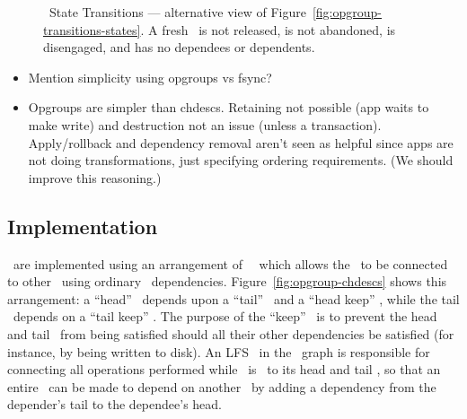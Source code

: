 \begin{figure}[htb]
\caption{\label{fig:opgroup-transitions-intuition} \Opgroup\ State
  Transitions --- alternative view of
  Figure~\ref{fig:opgroup-transitions-states}. A fresh \opgroup\ is
  not released, is not abandoned, is disengaged, and has no dependees
  or dependents.}
\end{figure}


\begin{itemize}
\item Mention simplicity using opgroups vs fsync?
\item Opgroups are simpler than chdescs. Retaining not possible (app
  waits to make write) and destruction not an issue (unless a
  transaction). Apply/rollback and dependency removal aren't seen as
  helpful since apps are not doing transformations, just specifying
  ordering requirements. (We should improve this reasoning.)
\end{itemize}


\subsection{Implementation}
\label{sec:opgroup:implementation}


\Opgroups\ are implemented using an arrangement of \noop\ \chdescs\ which allows
the \opgroup\ to be connected to other \opgroups\ using ordinary \chdesc\
dependencies.  Figure~\ref{fig:opgroup-chdescs} shows this arrangement: a
``head'' \chdesc\ depends upon a ``tail'' \chdesc\ and a ``head keep'' \chdesc,
while the tail \chdesc\ depends on a ``tail keep'' \chdesc. The purpose of the
``keep'' \chdescs\ is to prevent the head and tail \chdescs\ from being
satisfied should all their other dependencies be satisfied (for instance, by
being written to disk). An LFS \module\ in the \module\ graph is responsible for
connecting all operations performed while \anopgroup\ is \engaged\ to its head
and tail \chdescs, so that an entire \opgroup\ can be made to depend on another
\opgroup\ by adding a dependency from the depender's tail to the dependee's
head.

